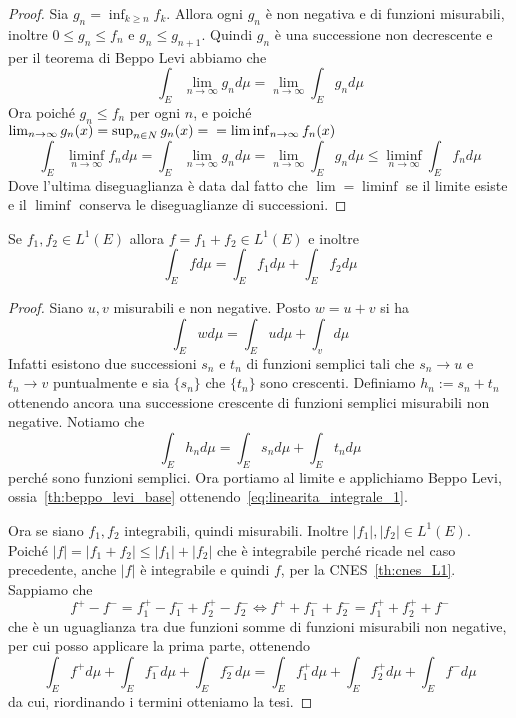 \begin{proof}
    Sia \(g_{n} = \inf_{k \ge n} f_{k}\). Allora ogni \(g_{n}\) è non negativa e
    di funzioni misurabili, inoltre \(0 \le g_{n} \le f_{n}\) e \(g_{n} \le
    g_{n+1} \). Quindi \(g_{n}\) è una successione non decrescente e
    per il teorema di Beppo Levi abbiamo che
    \[
        \int_E \lim_{n \to \infty} g_{n} d\mu = \lim_{n \to \infty} \int_E g_{n}
        d\mu
    \]
    Ora poiché \(g_{n} \le f_{n}\) per ogni \(n\), e poiché \(\lim_{n \to
    \infty} g_{n}(x) = \sup_{n \in N} g_{n}(x) =\\= \liminf_{n \to \infty} f_{n}(x)\) 
    \[
        \int_E \liminf_{n \to \infty} f_{n} d\mu = \int_E \lim_{n \to \infty}
        g_{n} d\mu = \lim_{n \to \infty} \int_E g_{n} d\mu \le \liminf_{n \to
        \infty} \int_E f_{n} d\mu
    \]
    Dove l'ultima diseguaglianza è data dal fatto che \(\lim =
    \liminf\) se il limite esiste e il \(\liminf\) conserva le diseguaglianze di
    successioni.
\end{proof}

\begin{proposition}
    Se \(f_{1}, f_{2} \in L^{1}(E)\) allora \(f = f_{1}+f_{2} \in L^{1}{(E)}\) e
    inoltre
    \[
        \int_E f d\mu = \int_E f_{1} d\mu + \int_E f_{2} d\mu
    \]
\end{proposition}
\begin{proof}
    Siano \(u,v\) misurabili e non negative. Posto \(w = u +v\) si ha 
    \begin{equation}\label{eq:linearita_integrale_1}
        \int_E w d\mu = \int_{E} u d\mu + \int_v d\mu
    \end{equation}
    Infatti esistono due successioni \(s_{n}\) e \(t_{n}\) di funzioni semplici
    tali che \(s_{n} \to u\) e \(t_{n} \to v\) puntualmente e sia \(\{s_{n}\} \)
    che \(\{t_{n}\} \) sono crescenti. Definiamo \(h_{n} := s_{n} + t_{n}\)
    ottenendo ancora una successione crescente di funzioni semplici misurabili
    non negative. Notiamo che  
    \[
        \int_E h_{n} d\mu = \int_E s_{n} d\mu + \int_E t_{n} d\mu
    \]
    perché sono funzioni semplici. Ora portiamo al limite e applichiamo Beppo
    Levi, ossia~\ref{th:beppo_levi_base}
    ottenendo~\eqref{eq:linearita_integrale_1}. 

    Ora se siano \(f_{1}, f_{2}\) integrabili, quindi misurabili. Inoltre
    \(|f_{1}|, |f_{2}| \in L^{1}{(E)}\). Poiché \(|f| = |f_{1}+f_{2}| \le
    |f_{1}|+|f_{2}|\) che è integrabile perché ricade nel caso precedente, anche
    \(|f|\) è integrabile e quindi \(f\), per la CNES~\ref{th:cnes_L1}.
    Sappiamo che 
    \[
        f^{+}- f^{-} = f_{1}^{+} -f_{1}^{-} + f_{2}^{+} - f_{2}^{-} \iff f^{+} +
        f^{-}_1 +f^{-}_2 = f_{1}^{+} + f_{2}^{+} + f^{-}
    \]
    che è un uguaglianza tra due funzioni somme di funzioni misurabili non
    negative, per cui posso applicare la prima parte, ottenendo
    \[
        \int_E f^{+} d\mu + \int_E f^{-}_1 d\mu + \int_E f^{-}_2 d\mu = \int_E
        f_{1}^{+} d\mu + \int_E f_{2}^{+} d\mu + \int_E f^{-} d\mu 
    \]
    da cui, riordinando i termini otteniamo la tesi.
\end{proof}

